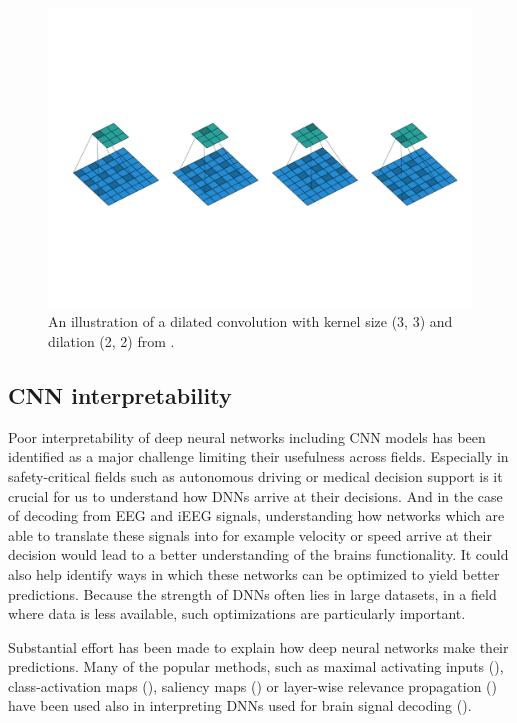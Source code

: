 \begin{figure}[!htpb]
\centering
   \includegraphics[width=0.8\linewidth]{img/ch3/dilated-conv}
   \caption[Dilated convolution]{An illustration of a dilated convolution with kernel size (3, 3) and dilation (2, 2) from \cite{dilated-conv}.}
   \label{fig:dilation}
\end{figure}


\subsection{CNN interpretability}\label{subsec:cnn-interpretability}
Poor interpretability of deep neural networks including CNN models has been identified as a major challenge limiting their usefulness across fields. 
Especially in safety-critical fields such as autonomous driving or medical decision support is it crucial for us to understand how DNNs arrive at their decisions.
And in the case of decoding from EEG and iEEG signals, understanding how networks which are able to translate these signals into for example velocity or speed arrive at their decision would lead to a better understanding of the brains functionality. 
It could also help identify ways in which these networks can be optimized to yield better predictions.
Because the strength of DNNs often lies in large datasets, in a field where data is less available, such optimizations are particularly important.

Substantial effort has been made to explain how deep neural networks make their predictions.
Many of the popular methods, such as maximal activating inputs (\cite{maximizing-activation}), class-activation maps (\cite{class-activation-maps}), saliency maps (\cite{gradient-visualization}) or layer-wise relevance propagation (\cite{sturm-interpretable-2016}) have been used also in interpreting DNNs used for brain signal decoding (\cite{goodfellow-towards-2018, hartmann-hierarchical-2018, rieke-visualizing-2018, yang-visual-2018,  sturm-interpretable-2016,}).

